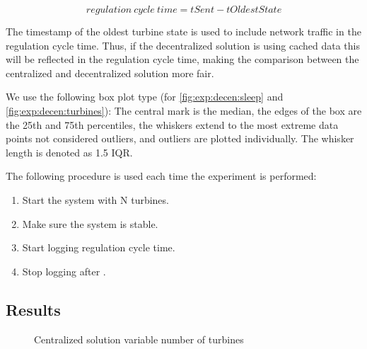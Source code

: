 $$regulation~cycle~time=tSent-tOldestState$$

The timestamp of the oldest turbine state is used to include network traffic in the regulation cycle time. Thus, if the decentralized solution is using cached data this will be reflected in the regulation cycle time, making the comparison between the centralized and decentralized solution more fair. 

We use the following box plot type (for \cref{fig:exp:decen:sleep} and \cref{fig:exp:decen:turbines}): The central mark is the median, the edges of the box are the 25th and 75th percentiles, the whiskers extend to the most extreme data points not considered outliers, and outliers are plotted individually. The whisker length is denoted as 1.5 IQR. 

The following procedure is used each time the experiment is performed:

\begin{minipage}{\textwidth}
	\begin{enumerate}
		\item Start the system with N turbines.
		\item Make sure the system is stable.
		\item Start logging regulation cycle time.
		\item Stop logging after \experiemntRunTime.
		\end{enumerate}
\end{minipage}


\subsection{Results}

\begin{figure}[h!]
	\centering
%	
%	
	
	\caption{Centralized solution variable number of turbines}
	\label{fig:exp:cen:turbines}
\end{figure}

